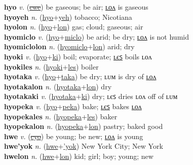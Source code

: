 \textbf{hyo} \textit{v.} (\hyperref[cwe]{\sout{cwe}})
be gaseous; be air; \hyperref[hyolon]{ʟᴏᴧ} is gaseous \label{hyo} \\
\textbf{hyoyeh} \textit{n.} (\hyperref[hyo]{hyo}+\hyperref[yeh]{yeh})
tobacco; Nicotiana \label{hyoyeh} \\
\textbf{hyolon} \textit{n.} (\hyperref[hyo]{hyo}+\hyperref[lon]{lon})
gas; cloud; gaseous; air \label{hyolon} \\
\textbf{hyomiclo} \textit{v.} (\hyperref[hyo]{hyo}+\hyperref[miclo]{miclo})
be arid; be dry; \hyperref[hyomiclolon]{ʟᴏᴧ} is not humid \label{hyomiclo} \\
\textbf{hyomiclolon} \textit{n.} (\hyperref[hyomiclo]{hyomiclo}+\hyperref[lon]{lon})
arid; dry \label{hyomiclolon} \\
\textbf{hyoki} \textit{v.} (\hyperref[hyo]{hyo}+\hyperref[ki]{ki})
boil; evaporate; \hyperref[hyokiles]{ʟєꜱ} boils ʟᴏᴧ \label{hyoki} \\
\textbf{hyokiles} \textit{n.} (\hyperref[hyoki]{hyoki}+\hyperref[les]{les})
boiler \label{hyokiles} \\
\textbf{hyotaka} \textit{v.} (\hyperref[hyo]{hyo}+\hyperref[taka]{taka})
be dry; ʟᴜᴍ is dry of \hyperref[hyotakalon]{ʟᴏᴧ} \label{hyotaka} \\
\textbf{hyotakalon} \textit{n.} (\hyperref[hyotaka]{hyotaka}+\hyperref[lon]{lon})
dry \label{hyotakalon} \\
\textbf{hyotakaki} \textit{v.} (\hyperref[hyotaka]{hyotaka}+\hyperref[ki]{ki})
dry; ʟєꜱ dries ʟᴏᴧ off of ʟᴜᴍ \label{hyotakaki} \\
\textbf{hyopeka} \textit{v.} (\hyperref[hyo]{hyo}+\hyperref[peka]{peka})
bake; \hyperref[hyopekales]{ʟєꜱ} bakes \hyperref[hyopekalon]{ʟᴏᴧ} \label{hyopeka} \\
\textbf{hyopekales} \textit{n.} (\hyperref[hyopeka]{hyopeka}+\hyperref[les]{les})
baker \label{hyopekales} \\
\textbf{hyopekalon} \textit{n.} (\hyperref[hyopeka]{hyopeka}+\hyperref[lon]{lon})
pastry; baked good \label{hyopekalon} \\
\textbf{hwe} \textit{v.} (\hyperref[cyo]{\sout{cyo}})
be young; be new; \hyperref[hwelon]{ʟᴏᴧ} is young \label{hwe} \\
\textbf{hwe'yok} \textit{n.} (\hyperref[hwe]{hwe}+\hyperref['yok]{'yok})
New York City; New York \label{hwe'yok} \\
\textbf{hwelon} \textit{n.} (\hyperref[hwe]{hwe}+\hyperref[lon]{lon})
kid; girl; boy; young; new \label{hwelon} \\
